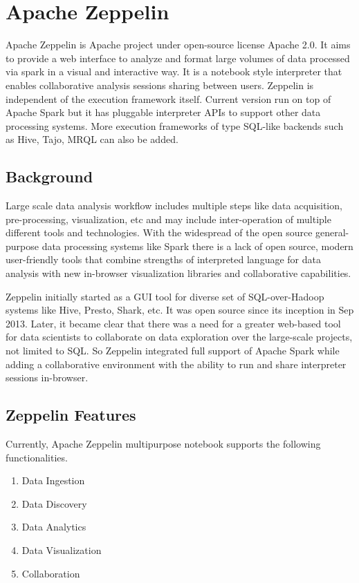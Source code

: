 \documentclass[9pt,twocolumn,twoside]{../../styles/osajnl}
\begin{document}
	
	
	\section{Apache Zeppelin}
	
	Apache Zeppelin is Apache project under open-source license 
	Apache 2.0. 
	It aims to provide a web interface to analyze and format large 
	volumes of data processed via spark in a visual and interactive 
	way. 
	It is a notebook style interpreter that enables collaborative 
	analysis sessions sharing between users. Zeppelin is independent 
	of 
	the execution framework itself. Current version run on top of 
	Apache 
	Spark but it has pluggable interpreter APIs to support other data 
	processing systems. More execution frameworks of type SQL-like 
	backends  such as Hive, Tajo, MRQL can also be added.
	
	\subsection{Background}
	
	Large scale data analysis workflow includes multiple steps like 
	data 
	acquisition, pre-processing, visualization, etc and may include 
	inter-operation of multiple different tools and technologies. 
	With 
	the widespread of the open source general-purpose data processing 
	systems like Spark there is a lack of open source, modern 
	user-friendly tools that combine strengths of interpreted 
	language 
	for data analysis with new in-browser visualization libraries and 
	collaborative capabilities.
	
	Zeppelin initially started as a GUI tool for diverse set of 
	SQL-over-Hadoop systems like Hive, Presto, Shark, etc. It was 
	open 
	source since its inception in Sep 2013. Later, it became clear 
	that 
	there was a need for a greater web-based tool for data scientists 
	to 
	collaborate on data exploration over the large-scale projects, 
	not 
	limited to SQL. So Zeppelin integrated full support of Apache 
	Spark 
	while adding a collaborative environment with the ability to run 
	and 
	share interpreter sessions in-browser.
	
	\subsection{Zeppelin Features}
	
	Currently, Apache Zeppelin multipurpose notebook supports the 
	following functionalities.
	\begin{enumerate}
		\item Data Ingestion
		\item Data Discovery
		\item Data Analytics
		\item Data Visualization
		\item Collaboration
	\end{enumerate}
	
\end{document}
